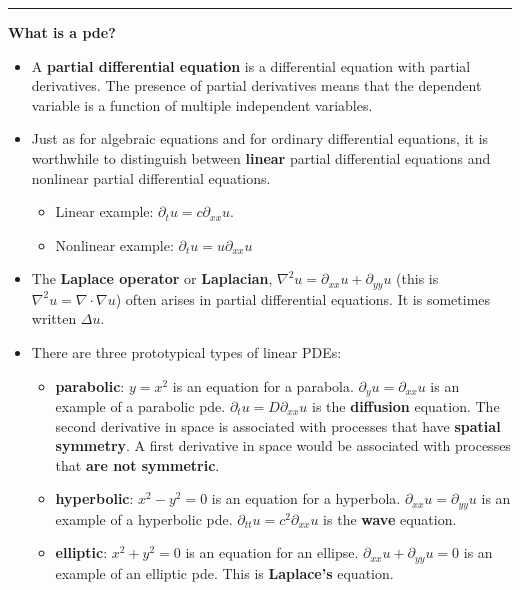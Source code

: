 \documentclass[12pt,letterpaper,noanswers]{exam}
\begin{document}
\vspace{0.2cm}
\hrule
\vspace{0.2cm}


\noindent\textbf{What is a pde?}
\begin{tcolorbox}
\begin{itemize}
\itemsep0em
    \item A \textbf{partial differential equation} is a differential equation with partial derivatives.  The presence of partial derivatives means that the dependent variable is a function of multiple independent variables.
    \item Just as for algebraic equations and for ordinary differential equations, it is worthwhile to distinguish between \textbf{linear} partial differential equations and nonlinear partial differential equations.
    \begin{itemize}
    \itemsep0em
        \item Linear example: $\partial_t u = c \partial_{xx} u$.
        \item Nonlinear example: $\partial_t u = u\partial_{xx} u$
    \end{itemize}
    \end{itemize}
\end{tcolorbox}
 \begin{tcolorbox}
\begin{itemize}
\itemsep0em   
    \item The \textbf{Laplace operator} or \textbf{Laplacian}, $\nabla^2 u = \partial_{xx} u + \partial_{yy} u$ (this is $\nabla^2 u = \nabla \cdot \nabla u$) often arises in partial differential equations.  It is sometimes written $\Delta u$.
    \item There are three prototypical types of linear PDEs:
    \begin{itemize}
    \itemsep0em
        \item \textbf{parabolic}: $y = x^2$ is an equation for a parabola.  $\partial_y u = \partial_{xx} u$ is an example of a parabolic pde.  $\partial_t u = D \partial_{xx} u$ is the \textbf{diffusion} equation.  The second derivative in space is associated with processes that have \textbf{spatial symmetry}.  A first derivative in space would be associated with processes that \textbf{are not symmetric}.
        \item \textbf{hyperbolic}: $x^2 - y^2 = 0$ is an equation for a hyperbola.  $\partial_{xx} u = \partial_{yy} u$ is an example of a hyperbolic pde.  $\partial_{tt} u = c^2 \partial_{xx}u$ is the \textbf{wave} equation.  
        \item \textbf{elliptic}: $x^2 + y^2 = 0$ is an equation for an ellipse.
        $\partial_{xx} u + \partial_{yy} u = 0$ is an example of an elliptic pde.  This is \textbf{Laplace's} equation.
    \end{itemize}
\end{itemize}
\end{tcolorbox}
\end{document}
